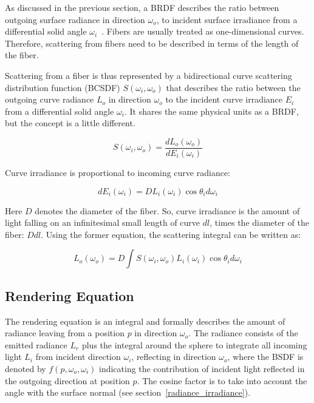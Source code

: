 \documentclass[11pt,a4paper]{report}
\begin{document}
As discussed in the previous section, a BRDF describes the ratio between outgoing surface radiance in direction $\omega_o$, to incident surface irradiance from a differential solid angle $\omega_i$~\cite{ward}. Fibers are usually treated as one-dimensional curves. Therefore, scattering from fibers need to be described in terms of the length of the fiber. 

Scattering from a fiber is thus represented by a bidirectional curve scattering distribution function (BCSDF) $S(\omega_i, \omega_o)$ that describes the ratio between the outgoing curve radiance $L_o$ in direction $\omega_o$ to the incident curve irradiance $E_i$ from a differential solid angle $\omega_i$. It shares the same physical units as a BRDF, but the concept is a little different.

\begin{equation}
S(\omega_i, \omega_o) = \frac{dL_o(\omega_o)}{dE_i(\omega_i)}
\end{equation}

Curve irradiance is proportional to incoming curve radiance:

\begin{equation}
dE_i(\omega_i) = D L_i(\omega_i) \cos \theta_i d \omega_i
\end{equation}

Here $D$ denotes the diameter of the fiber. So, curve irradiance is the amount of light falling on an infinitesimal small length of curve $dl$, times the diameter of the fiber: $D dl$. Using the former equation, the scattering integral can be written as:

\begin{equation}
L_o(\omega_o) = D \int S(\omega_i, \omega_o) L_i(\omega_i) \cos \theta_i d \omega_i
\label{eq_bcsdf}
\end{equation}


\subsection{Rendering Equation}

The rendering equation is an integral and formally describes the amount of radiance leaving from a position $p$ in direction $\omega_o$. The radiance consists of the emitted radiance $L_e$ plus the integral around the sphere to integrate all incoming light $L_i$ from incident direction $\omega_i$, reflecting in direction $\omega_o$, where the BSDF is denoted by $f(p, \omega_o, \omega_i)$ indicating the contribution of incident light reflected in the outgoing direction at position $p$. The cosine factor is to take into account the angle with the surface normal (see section~\ref{radiance_irradiance}).
\end{document}
